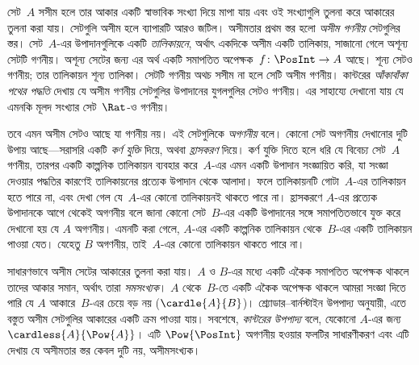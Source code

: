 সেট~$A$ সসীম হলে তার আকার একটি স্বাভাবিক সংখ্যা দিয়ে মাপা যায়
এবং ওই সংখ্যাগুলি তুলনা করে আকারের তুলনা করা যায়। সেটগুলি অসীম
হলে ব্যাপারটি আরও জটিল। অসীমতার প্রথম স্তর হলো \emph{অসীম গণনীয়}
সেটগুলির স্তর। সেট~$A$-এর উপাদানগুলিকে একটি \emph{তালিকায়নে},
অর্থাৎ একদিকে অসীম একটি তালিকায়, সাজানো গেলে অশূন্য সেটটি গণনীয়।
অশূন্য সেটের জন্য এর অর্থ একটি সমাপতিত অপেক্ষক~$f\colon \PosInt \to A$
আছে। শূন্য সেটও গণনীয়; তার তালিকায়ন শূন্য তালিকা।
সেটটি গণনীয় অথচ সসীম না হলে সেটি অসীম গণনীয়। কান্টরের
\emph{আঁকাবাঁকা পথের পদ্ধতি} দেখায় যে অসীম গণনীয় সেটগুলির
উপাদানের যুগলগুলির সেটও গণনীয়। এর সাহায্যে দেখানো যায় যে এমনকি
মূলদ সংখ্যার সেট~$\Rat$-ও গণনীয়।

তবে এমন অসীম সেটও আছে যা গণনীয় নয়। এই সেটগুলিকে \emph{অগণনীয়}
বলে। কোনো সেট অগণনীয় দেখানোর দুটি উপায় আছে—সরাসরি একটি
\emph{কর্ণ যুক্তি} দিয়ে, অথবা \emph{হ্রাসকরণ} দিয়ে। কর্ণ যুক্তি
দিতে হলে ধরি যে বিবেচ্য সেট~$A$ গণনীয়, তারপর একটি কাল্পনিক
তালিকায়ন ব্যবহার করে~$A$-এর এমন একটি উপাদান সংজ্ঞায়িত করি, যা
সংজ্ঞা দেওয়ার পদ্ধতির কারণেই তালিকায়নের প্রত্যেক উপাদান থেকে
আলাদা। ফলে তালিকায়নটি গোটা~$A$-এর তালিকায়ন হতে পারে না, এবং
দেখা গেল যে~$A$-এর কোনো তালিকায়নই থাকতে পারে না। হ্রাসকরণে
$A$-এর প্রত্যেক উপাদানকে আগে থেকেই অগণনীয় বলে জানা কোনো সেট~$B$-এর
একটি উপাদানের সঙ্গে সমাপতিতভাবে যুক্ত করে দেখানো হয় যে $A$
অগণনীয়। এমনটি করা গেলে, $A$-এর একটি কাল্পনিক তালিকায়ন
থেকে~$B$-এর একটি তালিকায়ন পাওয়া যেত। যেহেতু $B$ অগণনীয়,
তাই~$A$-এর কোনো তালিকায়ন থাকতে পারে না।

সাধারণভাবে অসীম সেটের আকারের তুলনা করা যায়। $A$ ও $B$-এর মধ্যে
একটি একৈক সমাপতিত অপেক্ষক থাকলে তাদের আকার সমান, অর্থাৎ তারা
\emph{সমসংখ্যক}। $A$ থেকে~$B$-তে একটি একৈক অপেক্ষক থাকলে আমরা
সংজ্ঞা দিতে পারি যে $A$ আকারে~$B$-এর চেয়ে বড় নয়
($\cardle{A}{B}$)। শ্র্যোডার--বার্নস্টাইন উপপাদ্য অনুযায়ী, এতে
বস্তুত অসীম সেটগুলির আকারের একটি ক্রম পাওয়া যায়। সবশেষে,
\emph{কান্টরের উপপাদ্য} বলে, যেকোনো $A$-এর জন্য
$\cardless{A}{\Pow{A}}$। এটি $\Pow{\PosInt}$ অগণনীয় হওয়ার
ফলটির সাধারণীকরণ এবং এটি দেখায় যে অসীমতার স্তর কেবল দুটি নয়,
অসীমসংখ্যক।
